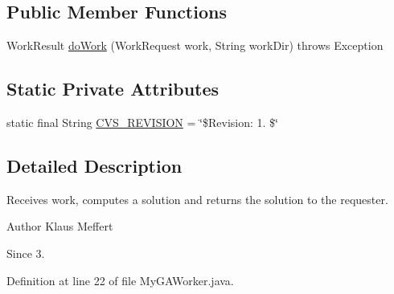 \subsection*{Public Member Functions}
\begin{DoxyCompactItemize}
\item 
Work\-Result \hyperlink{classexamples_1_1grid_1_1fitness_distributed_1_1_my_g_a_worker_a9e4cd9d8070fa00ee216bd289e018838}{do\-Work} (Work\-Request work, String work\-Dir)  throws Exception 
\end{DoxyCompactItemize}
\subsection*{Static Private Attributes}
\begin{DoxyCompactItemize}
\item 
static final String \hyperlink{classexamples_1_1grid_1_1fitness_distributed_1_1_my_g_a_worker_ae88e640437019b5aa72c98e882348af4}{C\-V\-S\-\_\-\-R\-E\-V\-I\-S\-I\-O\-N} = \char`\"{}\$Revision\-: 1. \$\char`\"{}
\end{DoxyCompactItemize}


\subsection{Detailed Description}
Receives work, computes a solution and returns the solution to the requester.

\begin{DoxyAuthor}{Author}
Klaus Meffert 
\end{DoxyAuthor}
\begin{DoxySince}{Since}
3. 
\end{DoxySince}


Definition at line 22 of file My\-G\-A\-Worker.\-java.



